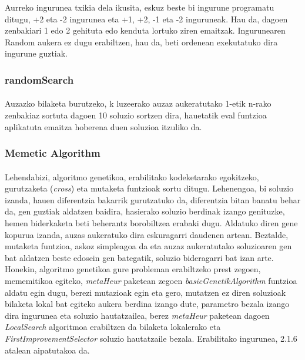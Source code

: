 \documentclass[eu,gi]{ifirak}\usepackage[]{graphicx}\usepackage[]{color}
\begin{document}
	Aurreko ingurunea txikia dela ikusita, eskuz beste bi ingurune programatu ditugu, +2 eta  -2 ingurunea eta +1, +2, -1 eta -2 inguruneak. Hau da, dagoen zenbakiari 1 edo 2 gehituta edo kenduta lortuko ziren emaitzak. 
	Ingurunearen Random aukera ez dugu erabiltzen, hau da, beti ordenean exekutatuko dira ingurune guztiak.\\

\subsubsection{randomSearch}
\paragraph{}
	Auzazko bilaketa burutzeko, k luzeerako auzaz aukeratutako 1-etik n-rako zenbakiaz sortuta dagoen 10 soluzio sortzen dira, hauetatik eval funtzioa aplikatuta emaitza hoberena duen soluzioa itzuliko da. 

\subsubsection{Memetic Algorithm}
\paragraph{}
	Lehendabizi, algoritmo genetikoa, erabilitako kodeketarako egokitzeko, gurutzaketa (\textit{cross}) eta mutaketa funtzioak sortu ditugu. Lehenengoa, bi soluzio izanda, hauen diferentzia bakarrik gurutzatuko da, diferentzia bitan banatu behar da, gen guztiak aldatzen baidira, hasierako soluzio berdinak izango genituzke, hemen biderkaketa beti beherantz borobiltzea erabaki dugu. Aldatuko diren gene kopurua izanda, auzas aukeratuko dira eskuragarri daudenen artean. Beztalde, mutaketa funtzioa, askoz simpleagoa da eta auzaz aukeratutako soluzioaren gen bat aldatzen beste edosein gen bategatik, soluzio bideragarri bat izan arte.\\
	
	Honekin, algoritmo genetikoa gure probleman erabiltzeko prest zegoen, mememitikoa egiteko, \textit{metaHeur} paketean zegoen \textit{basicGenetikAlgorithm} funtzioa aldatu egin dugu, berezi mutazioak egin eta gero, mutatzen ez diren soluzioak bilaketa lokal bat egiteko aukera berdina izango dute, parametro bezala izango dira ingurunea eta soluzio hautatzailea, berez \textit{metaHeur} paketean dagoen \textit{LocalSearch} algoritmoa erabiltzen da bilaketa lokalerako eta \textit{FirstImprovementSelector} soluzio hautatzaile bezala. Erabilitako ingurunea, 2.1.6 atalean aipatutakoa da.\\
\end{document}
